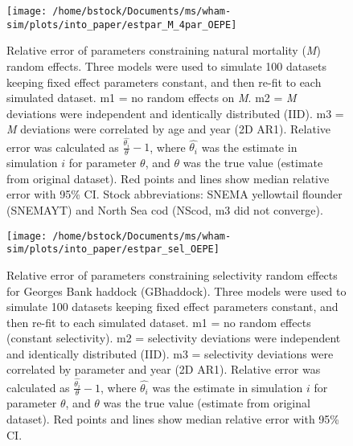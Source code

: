 \documentclass[]{article}
\begin{document}
\begin{figure}

{\centering \texttt{[image: /home/bstock/Documents/ms/wham-sim/plots/into\_paper/estpar\_M\_4par\_OEPE]} 

}

\caption{Relative error of parameters constraining natural mortality (\textit{M}) random effects. Three models were used to simulate 100 datasets keeping fixed effect parameters constant, and then re-fit to each simulated dataset. m1 = no random effects on \textit{M}. m2 = \textit{M} deviations were independent and identically distributed (IID). m3 = \textit{M} deviations were correlated by age and year (2D AR1). Relative error was calculated as $\frac{\hat{\theta_i}}{\theta} - 1$, where $\hat{\theta_i}$ was the estimate in simulation $i$ for parameter $\theta$, and $\theta$ was the true value (estimate from original dataset). Red points and lines show median relative error with 95\% CI. Stock abbreviations: SNEMA yellowtail flounder (SNEMAYT) and North Sea cod (NScod, m3 did not converge).}\label{fig:estpar-m}
\end{figure}

\pagebreak

\begin{figure}

{\centering \texttt{[image: /home/bstock/Documents/ms/wham-sim/plots/into\_paper/estpar\_sel\_OEPE]} 

}

\caption{Relative error of parameters constraining selectivity random effects for Georges Bank haddock (GBhaddock). Three models were used to simulate 100 datasets keeping fixed effect parameters constant, and then re-fit to each simulated dataset. m1 = no random effects (constant selectivity). m2 = selectivity deviations were independent and identically distributed (IID). m3 = selectivity deviations were correlated by parameter and year (2D AR1). Relative error was calculated as $\frac{\hat{\theta_i}}{\theta} - 1$, where $\hat{\theta_i}$ was the estimate in simulation $i$ for parameter $\theta$, and $\theta$ was the true value (estimate from original dataset). Red points and lines show median relative error with 95\% CI.}\label{fig:estpar-sel}
\end{figure}

\pagebreak
\end{document}
